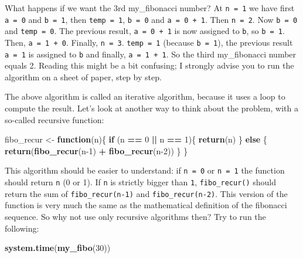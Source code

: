 \documentclass[]{gitbook}
\newenvironment{Shaded}{\begin{snugshade}}{\end{snugshade}}
\newcommand{\ControlFlowTok}[1]{\textcolor[rgb]{0.13,0.29,0.53}{\textbf{#1}}}
\newcommand{\DecValTok}[1]{\textcolor[rgb]{0.00,0.00,0.81}{#1}}
\newcommand{\KeywordTok}[1]{\textcolor[rgb]{0.13,0.29,0.53}{\textbf{#1}}}
\newcommand{\NormalTok}[1]{#1}
\newcommand{\OperatorTok}[1]{\textcolor[rgb]{0.81,0.36,0.00}{\textbf{#1}}}
\newcommand{\StringTok}[1]{\textcolor[rgb]{0.31,0.60,0.02}{#1}}
\theoremstyle{definition}
\theoremstyle{definition}
\theoremstyle{definition}
\theoremstyle{remark}
\begin{document}
What happens if we want the 3rd my\_fibonacci number? At
\texttt{n\ =\ 1} we have first \texttt{a\ =\ 0} and \texttt{b\ =\ 1},
then \texttt{temp\ =\ 1}, \texttt{b\ =\ 0} and \texttt{a\ =\ 0\ +\ 1}.
Then \texttt{n\ =\ 2}. Now \texttt{b\ =\ 0} and \texttt{temp\ =\ 0}. The
previous result, \texttt{a\ =\ 0\ +\ 1} is now assigned to \texttt{b},
so \texttt{b\ =\ 1}. Then, \texttt{a\ =\ 1\ +\ 0}. Finally,
\texttt{n\ =\ 3}. \texttt{temp\ =\ 1} (because \texttt{b\ =\ 1}), the
previous result \texttt{a\ =\ 1} is assigned to \texttt{b} and finally,
\texttt{a\ =\ 1\ +\ 1}. So the third my\_fibonacci number equals 2.
Reading this might be a bit confusing; I strongly advise you to run the
algorithm on a sheet of paper, step by step.

The above algorithm is called an iterative algorithm, because it uses a
loop to compute the result. Let's look at another way to think about the
problem, with a so-called recursive function:

\begin{Shaded}
\begin{Highlighting}[]
\NormalTok{fibo_recur <-}\StringTok{ }\ControlFlowTok{function}\NormalTok{(n)\{}
 \ControlFlowTok{if}\NormalTok{ (n }\OperatorTok{==}\StringTok{ }\DecValTok{0} \OperatorTok{||}\StringTok{ }\NormalTok{n }\OperatorTok{==}\StringTok{ }\DecValTok{1}\NormalTok{)\{}
   \KeywordTok{return}\NormalTok{(n)}
\NormalTok{   \} }\ControlFlowTok{else}\NormalTok{ \{}
     \KeywordTok{return}\NormalTok{(}\KeywordTok{fibo_recur}\NormalTok{(n}\DecValTok{-1}\NormalTok{) }\OperatorTok{+}\StringTok{ }\KeywordTok{fibo_recur}\NormalTok{(n}\DecValTok{-2}\NormalTok{))}
\NormalTok{   \}}
\NormalTok{\}}
\end{Highlighting}
\end{Shaded}

This algorithm should be easier to understand: if \texttt{n\ =\ 0} or
\texttt{n\ =\ 1} the function should return \texttt{n} (0 or 1). If
\texttt{n} is strictly bigger than \texttt{1}, \texttt{fibo\_recur()}
should return the sum of \texttt{fibo\_recur(n-1)} and
\texttt{fibo\_recur(n-2)}. This version of the function is very much the
same as the mathematical definition of the fibonacci sequence. So why
not use only recursive algorithms then? Try to run the following:

\begin{Shaded}
\begin{Highlighting}[]
\KeywordTok{system.time}\NormalTok{(}\KeywordTok{my_fibo}\NormalTok{(}\DecValTok{30}\NormalTok{))}
\end{Highlighting}
\end{Shaded}
\end{document}
